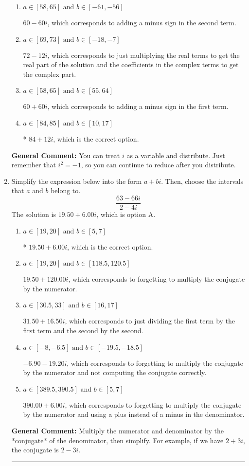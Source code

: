 \documentclass{extbook}[14pt]
\newcommand{\litem}[1]{\item #1

\rule{\textwidth}{0.4pt}}
\begin{document}
\begin{enumerate}
{\begin{enumerate}[label=\Alph*.]
 $84 - 12 i$, which corresponds to adding a minus sign in both terms.
\item \( a \in [58, 65] \text{ and } b \in [-61, -56] \)

 $60 - 60 i$, which corresponds to adding a minus sign in the second term.
\item \( a \in [69, 73] \text{ and } b \in [-18, -7] \)

 $72 - 12 i$, which corresponds to just multiplying the real terms to get the real part of the solution and the coefficients in the complex terms to get the complex part.
\item \( a \in [58, 65] \text{ and } b \in [55, 64] \)

 $60 + 60 i$, which corresponds to adding a minus sign in the first term.
\item \( a \in [84, 85] \text{ and } b \in [10, 17] \)

* $84 + 12 i$, which is the correct option.
\end{enumerate}

\textbf{General Comment:} You can treat $i$ as a variable and distribute. Just remember that $i^2=-1$, so you can continue to reduce after you distribute.
}
\litem{
Simplify the expression below into the form $a+bi$. Then, choose the intervals that $a$ and $b$ belong to.
\[ \frac{63 - 66 i}{2 - 4 i} \]The solution is \( 19.50  + 6.00 i \), which is option A.\begin{enumerate}[label=\Alph*.]
\item \( a \in [19, 20] \text{ and } b \in [5, 7] \)

* $19.50  + 6.00 i$, which is the correct option.
\item \( a \in [19, 20] \text{ and } b \in [118.5, 120.5] \)

 $19.50  + 120.00 i$, which corresponds to forgetting to multiply the conjugate by the numerator.
\item \( a \in [30.5, 33] \text{ and } b \in [16, 17] \)

 $31.50  + 16.50 i$, which corresponds to just dividing the first term by the first term and the second by the second.
\item \( a \in [-8, -6.5] \text{ and } b \in [-19.5, -18.5] \)

 $-6.90  - 19.20 i$, which corresponds to forgetting to multiply the conjugate by the numerator and not computing the conjugate correctly.
\item \( a \in [389.5, 390.5] \text{ and } b \in [5, 7] \)

 $390.00  + 6.00 i$, which corresponds to forgetting to multiply the conjugate by the numerator and using a plus instead of a minus in the denominator.
\end{enumerate}

\textbf{General Comment:} Multiply the numerator and denominator by the *conjugate* of the denominator, then simplify. For example, if we have $2+3i$, the conjugate is $2-3i$.
}
\end{enumerate}
\end{document}
